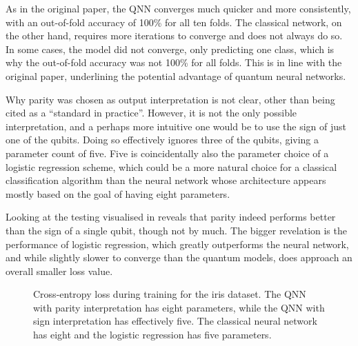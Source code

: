 As in the original paper, the QNN converges much quicker and more consistently, with an out-of-fold accuracy of 100\% for all ten folds.
The classical network, on the other hand, requires more iterations to converge and does not always do so.
In some cases, the model did not converge, only predicting one class, which is why the out-of-fold accuracy was not 100\% for all folds.
This is in line with the original paper, underlining the potential advantage of quantum neural networks.

Why parity was chosen as output interpretation is not clear, other than being cited as a \enquote{standard in practice}.
However, it is not the only possible interpretation, and a perhaps more intuitive one would be to use the sign of just one of the qubits.
Doing so effectively ignores three of the qubits, giving a parameter count of five.
Five is coincidentally also the parameter choice of a logistic regression scheme, which could be a more natural choice for a classical classification algorithm than the neural network whose architecture appears mostly based on the goal of having eight parameters.

Looking at the testing visualised in  reveals that parity indeed performs better than the sign of a single qubit, though not by much.
The bigger revelation is the performance of logistic regression, which greatly outperforms the neural network, and while slightly slower to converge than the quantum models, does approach an overall smaller loss value.

\begin{figure}
    \centering
    \caption{
        Cross-entropy loss during training for the iris dataset.
        The QNN with parity interpretation has eight parameters, while the QNN with sign interpretation has effectively five.
        The classical neural network has eight and the logistic regression has five parameters.
    }
    \label{fig:iris_training_lr}
\end{figure}


